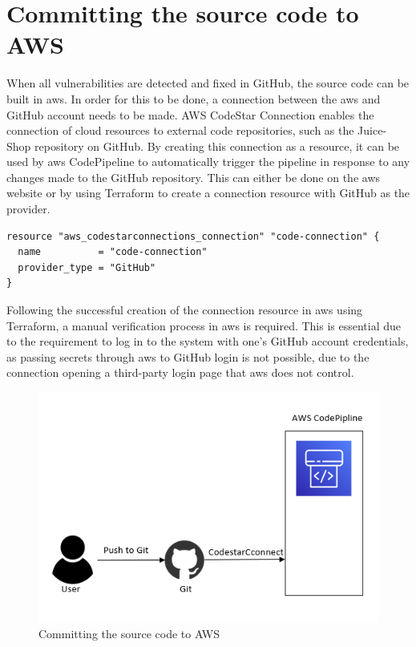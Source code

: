 \section{Committing the source code to AWS}
When all vulnerabilities are detected and fixed in GitHub, the source code can be built in \acrshort{aws}. In order for this to be done, a connection between the \acrshort{aws} and GitHub account needs to be made. AWS CodeStar Connection enables the connection of cloud resources to external code repositories, such as the Juice-Shop repository on GitHub. By creating this connection as a resource, it can be used by \acrshort{aws} CodePipeline to automatically trigger the pipeline in response to any changes made to the GitHub repository.
This can either be done on the \acrshort{aws} website or by using Terraform to create a connection resource with GitHub as the provider. 

\begin{tcolorbox}
\begin{verbatim}
resource "aws_codestarconnections_connection" "code-connection" {
  name          = "code-connection"
  provider_type = "GitHub"
}    
\end{verbatim}
\end{tcolorbox}

Following the successful creation of the connection resource in \acrshort{aws} using Terraform, a manual verification process in \acrshort{aws} is required. This is essential due to the requirement to log in to the system with one's GitHub account credentials, as passing secrets through \acrshort{aws} to GitHub login is not possible, due to the connection opening a third-party login page that \acrshort{aws} does not control.

\vspace{2mm}
\begin{figure}[H]
    \centering
    \includegraphics[width=0.6\columnwidth]{Images/aws-piplin-2-1.png}
    \caption{Committing the source code to AWS}
    \label{fig: Committing the source code to AWS}
\end{figure}

